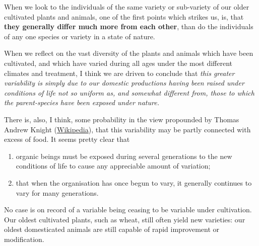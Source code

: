 When we look to the individuals of the same variety or sub-variety of our older cultivated plants and animals, one of the first points which strikes us, is, that \textbf{they generally differ much more from each other}, than do the individuals of any one species or variety in a state of nature.

When we reflect on the vast diversity of the plants and animals which have been cultivated, and which have varied during all ages under the most different climates and treatment, I think we are driven to conclude that \textit{this greater variability is simply due to our domestic productions having been raised under conditions of life not so uniform as, and somewhat different from, those to which the parent-species have been exposed under nature.}

There is, also, I think, some probability in the view propounded by Thomas Andrew Knight (\href{http://en.wikipedia.org/wiki/Main_Page}{Wikipedia}), that this variability may be partly connected with excess of food. It seems pretty clear that

\begin{enumerate}
\item organic beings must be exposed during several generations to the new conditions of life to cause any appreciable amount of variation;
\item that when the organisation has once begun to vary, it generally continues to vary for many generations.
\end{enumerate}

No case is on record of a variable being ceasing to be variable under cultivation. Our oldest cultivated plants, such as wheat, still often yield new varieties: our oldest domesticated animals are still capable of rapid improvement or modification.